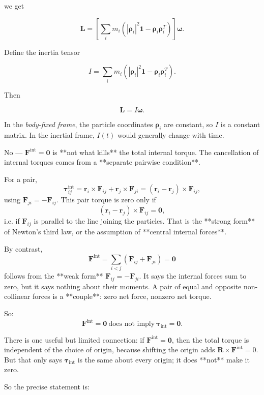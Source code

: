\documentclass[a4paper,11pt]{article}
\begin{document}
we get

\[
\mathbf L
=
\left[
\sum_i m_i\left(|\boldsymbol\rho_i|^2\mathbf 1
-\boldsymbol\rho_i\boldsymbol\rho_i^T\right)
\right]\boldsymbol\omega.
\]

Define the inertia tensor

\[
I=\sum_i m_i\left(|\boldsymbol\rho_i|^2\mathbf 1
-\boldsymbol\rho_i\boldsymbol\rho_i^T\right).
\]

Then

\[
\mathbf L=I\boldsymbol\omega.
\]

In the \emph{body-fixed frame}, the particle coordinates \(\boldsymbol\rho_i\) are
constant, so \(I\) is a constant matrix. In the inertial frame, \(I(t)\) would
generally change with time.

\hrulefill

No — \(\mathbf F^{\mathrm{int}}=\mathbf 0\) is **not what kills** the total
internal torque. The cancellation of internal torques comes from a
**separate pairwise condition**.

For a pair,
\[
\boldsymbol\tau_{ij}^{\mathrm{int}}
=
\mathbf r_i\times \mathbf F_{ij}
+
\mathbf r_j\times \mathbf F_{ji}
=
(\mathbf r_i-\mathbf r_j)\times \mathbf F_{ij},
\]
using \(\mathbf F_{ji}=-\mathbf F_{ij}\). This pair torque is zero only if
\[
(\mathbf r_i-\mathbf r_j)\times \mathbf F_{ij}=\mathbf 0,
\]
i.e. if \(\mathbf F_{ij}\) is parallel to the line joining the particles.
That is the **strong form** of Newton’s third law, or the assumption of
**central internal forces**.

By contrast,
\[
\mathbf F^{\mathrm{int}}
=
\sum_{i<j}(\mathbf F_{ij}+\mathbf F_{ji})
=
\mathbf 0
\]
follows from the **weak form** \(\mathbf F_{ij}=-\mathbf F_{ji}\). It says the
internal forces sum to zero, but it says nothing about their moments. A pair of
equal and opposite non-collinear forces is a **couple**: zero net force, nonzero net torque.

So:
\[
\boxed{
\mathbf F^{\mathrm{int}}=\mathbf 0
\ \text{does not imply}\
\boldsymbol\tau_{\mathrm{int}}=\mathbf 0.
}
\]

There is one useful but limited connection: if \(\mathbf F^{\mathrm{int}}=\mathbf 0\),
then the total torque is independent of the choice of origin, because shifting the
origin adds \(\mathbf R\times \mathbf F^{\mathrm{int}}=0\). But that only says
\(\boldsymbol\tau_{\mathrm{int}}\) is the same about every origin; it does
**not** make it zero.

So the precise statement is:
\end{document}
